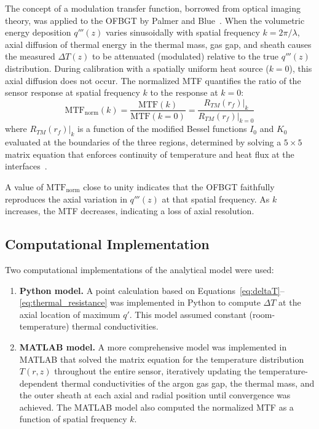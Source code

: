The concept of a modulation transfer function, borrowed from optical imaging theory, was applied to the OFBGT by Palmer and Blue~\cite{Palmer2018}.  When the volumetric energy deposition $q'''(z)$ varies sinusoidally with spatial frequency $k = 2\pi/\lambda$, axial diffusion of thermal energy in the thermal mass, gas gap, and sheath causes the measured $\Delta T(z)$ to be attenuated (modulated) relative to the true $q'''(z)$ distribution.  During calibration with a spatially uniform heat source ($k = 0$), this axial diffusion does not occur.  The normalized MTF quantifies the ratio of the sensor response at spatial frequency $k$ to the response at $k = 0$:
\begin{equation}
    \mathrm{MTF}_\mathrm{norm}(k) = \frac{\mathrm{MTF}(k)}{\mathrm{MTF}(k=0)} = \frac{R_{TM}(r_f)\big|_k}{R_{TM}(r_f)\big|_{k=0}}
    \label{eq:MTF_norm}
\end{equation}
where $R_{TM}(r_f)\big|_k$ is a function of the modified Bessel functions $I_0$ and $K_0$ evaluated at the boundaries of the three regions, determined by solving a $5 \times 5$ matrix equation that enforces continuity of temperature and heat flux at the interfaces~\cite{Birri2020IEEE, SimReport2023}.

A value of $\mathrm{MTF}_\mathrm{norm}$ close to unity indicates that the OFBGT faithfully reproduces the axial variation in $q'''(z)$ at that spatial frequency.  As $k$ increases, the MTF decreases, indicating a loss of axial resolution.

\subsection{Computational Implementation}

Two computational implementations of the analytical model were used:

\begin{enumerate}
    \item \textbf{Python model.}  A point calculation based on Equations~\ref{eq:deltaT}--\ref{eq:thermal_resistance} was implemented in Python to compute $\Delta T$ at the axial location of maximum $q'$.  This model assumed constant (room-temperature) thermal conductivities.
    \item \textbf{MATLAB model.}  A more comprehensive model was implemented in MATLAB that solved the matrix equation for the temperature distribution $T(r,z)$ throughout the entire sensor, iteratively updating the temperature-dependent thermal conductivities of the argon gas gap, the thermal mass, and the outer sheath at each axial and radial position until convergence was achieved.  The MATLAB model also computed the normalized MTF as a function of spatial frequency $k$.
\end{enumerate}

